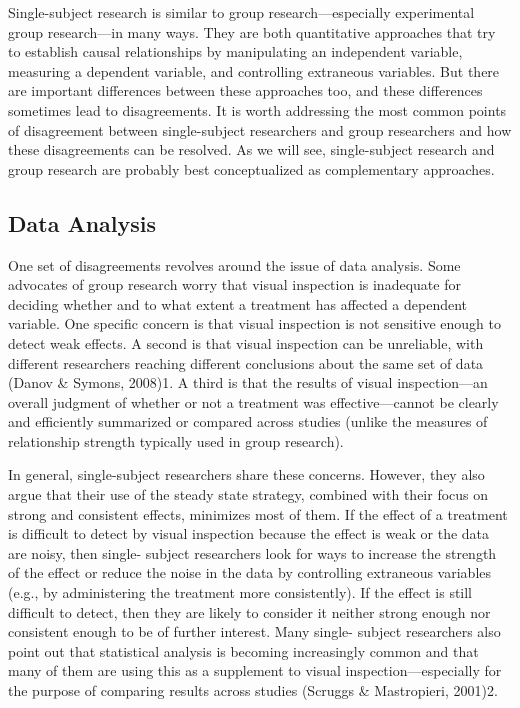  Single-subject research is similar to group research---especially experimental group research---in many ways. They are both quantitative approaches that try to establish causal relationships by manipulating an independent variable, measuring a dependent variable, and controlling extraneous variables. But there are important differences between these approaches too, and these differences sometimes lead to disagreements. It is worth addressing the most common points of disagreement between single-subject researchers and group researchers and how these disagreements can be resolved. As we will see, single-subject research and group research are probably best conceptualized as complementary approaches.
 
 \subsection{Data Analysis}
 
 One set of disagreements revolves around the issue of data analysis. Some advocates of group research worry that visual inspection is inadequate for deciding whether and to what extent a treatment has affected a dependent variable. One specific concern is that visual inspection is not sensitive enough to detect weak effects. A second is that visual inspection can be unreliable, with different researchers reaching different conclusions about the same set of data (Danov \& Symons, 2008)1. A third is that the results of visual inspection---an overall judgment of whether or not a treatment was effective---cannot be clearly and efficiently summarized or compared across studies (unlike the measures of relationship strength typically used in group research).
 
 In general, single-subject researchers share these concerns. However, they also argue that their use of the steady state strategy, combined with their focus on strong and consistent effects, minimizes most of them. If the effect of a treatment is difficult to detect by visual inspection because the effect is weak or the data are noisy, then single- subject researchers look for ways to increase the strength of the effect or reduce the noise in the data by controlling extraneous variables (e.g., by administering the treatment more consistently). If the effect is still difficult to detect, then they are likely to consider it neither strong enough nor consistent enough to be of further interest. Many single- subject researchers also point out that statistical analysis is becoming increasingly common and that many of them are using this as a supplement to visual inspection---especially for the purpose of comparing results across studies (Scruggs \& Mastropieri, 2001)2.
 
